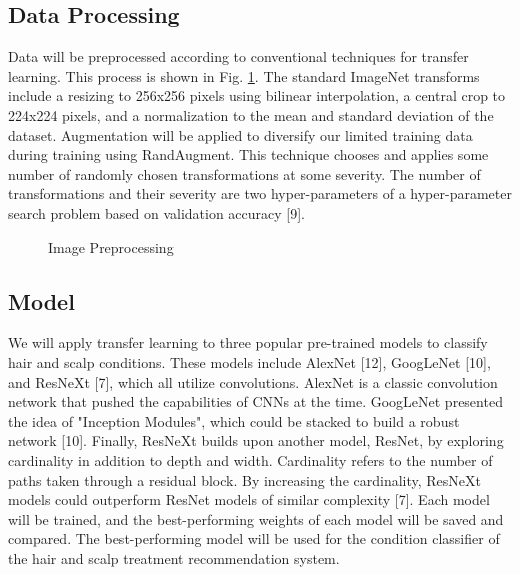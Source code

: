 \documentclass[10pt,twocolumn,letterpaper]{article}
\begin{document}
\subsection{Data Processing}
Data will be preprocessed according to conventional techniques for transfer learning. This process is shown in Fig. \ref{figimgpre}. The standard ImageNet transforms include a resizing to 256x256 pixels using bilinear interpolation, a central crop to 224x224 pixels, and a normalization to the mean and standard deviation of the dataset. Augmentation will be applied to diversify our limited training data during training using RandAugment. This technique chooses and applies some number of randomly chosen transformations at some severity. The number of transformations and their severity are two hyper-parameters of a hyper-parameter search problem based on validation accuracy [9].
\begin{figure}[htp]
  \hspace*{\fill}%
  \hfill%
  \hfill%
  \hspace*{\fill}%
\caption{Image Preprocessing}
\label{figimgpre}
\end{figure}

\subsection{Model}
We will apply transfer learning to three popular pre-trained models to classify hair and scalp conditions. These models include AlexNet [12], GoogLeNet [10], and ResNeXt [7], which all utilize convolutions. AlexNet is a classic convolution network that pushed the capabilities of CNNs at the time. GoogLeNet presented the idea of "Inception Modules", which could be stacked to build a robust network [10]. Finally, ResNeXt builds upon another model, ResNet, by exploring cardinality in addition to depth and width. Cardinality refers to the number of paths taken through a residual block. By increasing the cardinality, ResNeXt models could outperform ResNet models of similar complexity [7]. Each model will be trained, and the best-performing weights of each model will be saved and compared. The best-performing model will be used for the condition classifier of the hair and scalp treatment recommendation system.
\end{document}
